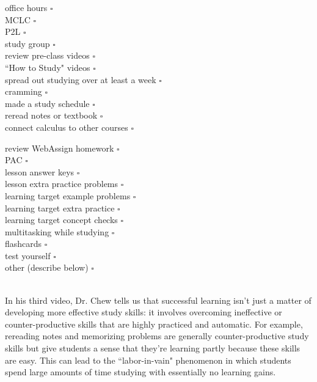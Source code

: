 \documentclass[10pt]{article}
\begin{document}
\begin{enumerate}
\begin{minipage}[t][3.25in][t]{0.45\textwidth}
office hours \dotfill $\square$\\[0.1in]
MCLC \dotfill $\square$\\[0.1in]
P2L \dotfill $\square$\\[0.1in]
study group \dotfill $\square$\\[0.1in]
review pre-class videos \dotfill $\square$\\[0.1in]
``How to Study" videos \dotfill $\square$\\[0.1in]
spread out studying over at least a week \dotfill $\square$\\[0.1in]
cramming \dotfill $\square$\\[0.1in]
made a study schedule \dotfill $\square$\\[0.1in]
reread notes or textbook \dotfill $\square$\\[0.1in]
connect calculus to other courses \dotfill $\square$\\[0.1in]
\end{minipage}
\hfill
\begin{minipage}[t][3.25in][t]{.45\textwidth}
review WebAssign homework \dotfill $\square$\\[0.1in]
PAC \dotfill $\square$\\[0.1in]
lesson answer keys \dotfill $\square$\\[0.1in]
lesson extra practice problems \dotfill $\square$\\[0.1in]
learning target example problems \dotfill $\square$\\[0.1in]
learning target extra practice \dotfill $\square$\\[0.1in]
learning target concept checks \dotfill $\square$\\[0.1in]
multitasking while studying \dotfill $\square$\\[0.1in]
flashcards \dotfill $\square$\\[0.1in]
test yourself \dotfill $\square$\\[0.1in]
other (describe below) \dotfill $\square$\\[0.1in]
\end{minipage}
\hfill\,\\

In his third video, Dr. Chew tells us that successful learning isn't just a matter of developing more effective study skills: it involves overcoming ineffective or counter-productive skills that are highly practiced and automatic. For example, rereading notes and memorizing problems are generally counter-productive study skills but give students a sense that they're learning partly because these skills are easy. This can lead to the ``labor-in-vain" phenomenon in which students spend large amounts of time studying with essentially no learning gains.\\


\end{enumerate}
\end{document}
